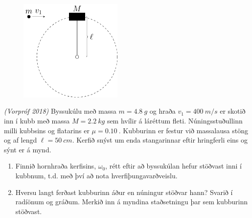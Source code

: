 \begin{enumerate}[label = \textbf{Dæmi \thechapter.\arabic*.}]
\vspace{0.5cm}

\begin{minipage}{\linewidth}

\begin{figure}
\vspace{-1cm}
\includegraphics[width=2in]{images/angular_test.pdf}
\end{figure}

\item \textit{(Vorpróf 2018)} Byssukúlu með massa $m = \SI{4.8}{g}$ og hraða $v_1 = \SI{400}{m/s}$ er skotið inn í kubb með massa $M = \SI{2.2}{kg}$ sem hvílir á láréttum fleti. Núningsstuðullinn milli kubbsins og flatarins er $\mu = \SI{0.10}{}$. Kubburinn er festur við massalausa stöng og af lengd $\ell = \SI{50}{cm}$. Kerfið snýst um enda stangarinnar eftir hringferli eins og sýnt er á mynd.

\vspace{0.2cm}

\begin{enumerate}[label = \textbf{(\alph*)}]
    \item Finnið hornhraða kerfisins, $\omega_0$, rétt eftir að byssukúlan hefur stöðvast inni í kubbnum, t.d. með því að nota hverfiþungavarðveislu.
    \item Hversu langt ferðast kubburinn áður en núningur stöðvar hann? Svarið í radíönum og gráðum. Merkið inn á myndina staðsetningu þar sem kubburinn stöðvast.
\end{enumerate}
\end{minipage}

\vspace{0.5cm}

\begin{minipage}{\linewidth}


\end{minipage}
\end{enumerate}
